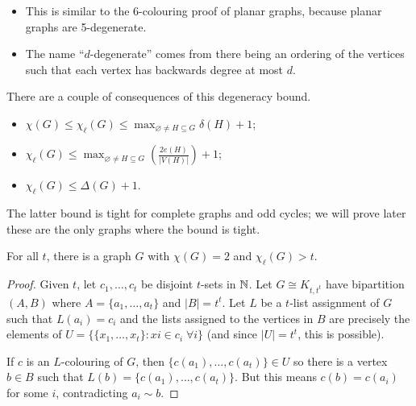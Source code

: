 \documentclass[main.tex]{subfiles}
\begin{document}
\begin{remark*}
  \listhack
  \begin{itemize}
    \item This is similar to the 6-colouring proof of planar graphs,
      because planar graphs are 5-degenerate.

    \item The name ``$d$-degenerate'' comes from there being an ordering of
      the vertices such that each vertex has backwards degree at most $d$.
  \end{itemize}
\end{remark*}
There are a couple of consequences of this degeneracy bound.
\begin{corollary}
  \listhack
  \begin{itemize}
    \item $\chi(G)\leq\chi_\ell(G)\leq\max_{\varnothing\neq H\subseteq G}\delta(H) + 1$;

    \item $\chi_\ell(G)\leq\max_{\varnothing\neq H\subseteq G}
      \left(\frac{2e(H)}{|V(H)|}\right)+1$; 

    \item $\chi_\ell(G)\leq\Delta(G) + 1$.
  \end{itemize}
\end{corollary}
The latter bound is tight for complete graphs and odd cycles;
we will prove later these are the only graphs where the bound is tight.

\begin{theorem} %
  For all $t$, there is a graph $G$ with $\chi(G) = 2$ and $\chi_\ell(G) > t$.
\end{theorem}
\begin{proof}
  Given $t$, let $c_1,\ldots,c_t$ be disjoint $t$-sets in $\mathbb N$.
  Let $G\cong K_{t,t^t}$ have bipartition $(A,B)$ where $A = \{a_1,\ldots,a_t\}$
  and $|B| = t^t$.
  Let $L$ be a $t$-list assignment of $G$ such that $L(a_i) = c_i$ and the lists
  assigned to the vertices in $B$ are precisely the elements of
  $U = \{\{x_1,\ldots,x_t\} :xi\in c_i\;\forall i\}$ (and since $|U| = t^t$,
  this is possible).

  If $c$ is an $L$-colouring of $G$, then $\{c(a_1),\ldots,c(a_t)\}\in U$
  so there is a vertex $b\in B$ such that $L(b) = \{c(a_1), \ldots, c(a_t)\}$.
  But this means $c(b) = c(a_i)$ for some $i$, contradicting $a_i\sim b$.
\end{proof}
\end{document}
